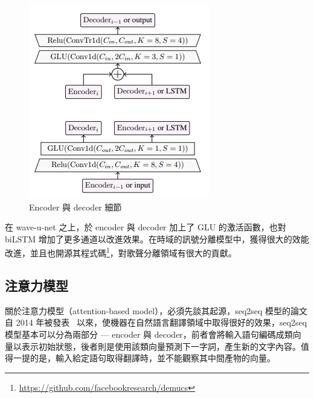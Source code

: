 \begin{figure}[htbp]
\begin{minipage}[t]{0.45\textwidth}
        \includegraphics[width=\textwidth]{./figures/chapter02_method/demucs2.png}
        \caption {Encoder 與 decoder 細節}
        \label{demucs2}
    \end{minipage}
    \hfil
\end{figure}
在 wave-u-net 之上，於 encoder 與 decoder 加上了 GLU 的激活函數，也對 biLSTM 增加了更多通道以改進效果。在時域的訊號分離模型中，獲得很大的效能改進，並且也開源其程式碼\footnote{\url{https://github.com/facebookresearch/demucs}}，對歌聲分離領域有很大的貢獻。

\subsection{注意力模型}
關於注意力模型（attention-based model），必須先談其起源，seq2seq 模型的論文自 2014 年被發表~\cite{vaswani2017attention} 以來，使機器在自然語言翻譯領域中取得很好的效果，seq2seq 模型基本可以分為兩部分 — encoder 與 decoder，前者會將輸入語句編碼成類向量以表示初始狀態，後者則是使用該類向量預測下一字詞，產生新的文字內容。值得一提的是，輸入給定語句取得翻譯時，並不能觀察其中間產物的向量。

